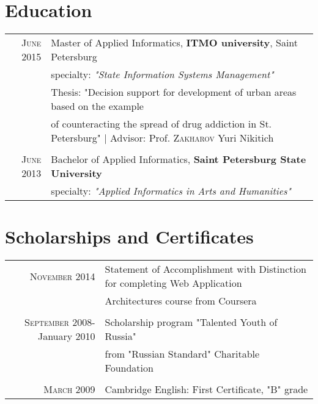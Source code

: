 \documentclass[a4paper,10pt]{article} %
\begin{document}

\section{Education}

\begin{tabular}{rl}	
    \textsc{June} 2015 & Master of Applied Informatics,
        \textbf{ITMO university}, Saint Petersburg\\
        & specialty: \small\emph{"State Information Systems Management"}
\medskip
\\
& Thesis: "Decision support for development of urban areas based on the example
\\&
 of counteracting the spread 
of drug addiction in St. Petersburg" | \small Advisor:  Prof.
\textsc{Zakharov} Yuri Nikitich
\\

\multicolumn{2}{c}{} \\

\textsc{June} 2013 & Bachelor of Applied Informatics,
\textbf{Saint Petersburg State University}\\
& specialty: \small\emph{"Applied Informatics in Arts and Humanities"}
\end{tabular}


\section{Scholarships and Certificates}

\begin{tabular}{rl}
    \textsc{November} 2014& Statement of Accomplishment with Distinction for
    completing Web Application \\&Architectures course from Coursera\\
\multicolumn{2}{c}{} \\
    \textsc{September} 2008-January 2010& Scholarship program "Talented Youth of
Russia" \\&from "Russian Standard" Charitable Foundation\\
\multicolumn{2}{c}{} \\
    \textsc{March} 2009& Cambridge English: First Certificate, "B" grade
\\
\end{tabular}
\end{document}
